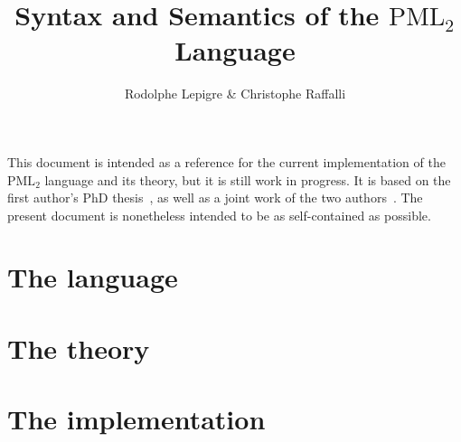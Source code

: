 \documentclass[oneside,a4]{book}
\newcommand{\pml}{$\text{PML}_2$\xspace}
\begin{document}
\title{Syntax and Semantics of the \pml Language}
\author{Rodolphe Lepigre \& Christophe Raffalli}
\date{}

\maketitle

This document is intended as a reference for the current implementation of
the \pml language and its theory, but it is still work in progress. It is
based on the first author's PhD thesis~\cite{Lepigre2017PhD}, as well as a
joint work of the two authors~\cite{LepRaf2018a}. The present document is
nonetheless intended to be as self-contained as possible.

\tableofcontents

\mainmatter

\part{The language}



\part{The theory}



\part{The implementation}





\end{document}
